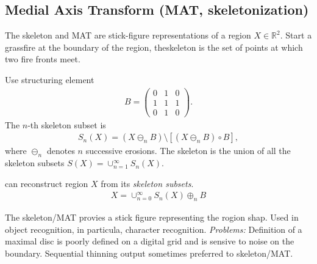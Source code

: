\subsection{Medial Axis Transform (MAT, skeletonization)}
	 The skeleton and MAT are stick-figure representations of a region $X\in\mathbb{R}^2$. Start a grassfire at the boundary of the region, theskeleton is the set of points at which two fire fronts meet.
\begin{compactdesc}
	\item[\lp{Skeleton}] Use structuring element
		\begin{gather*}
			B=\left( 
				\begin{smallmatrix}
					0&1&0\\
					1&1&1\\
					0&1&0
				\end{smallmatrix}\right).
		\end{gather*} The $n$-th skeleton subset is 
		\begin{gather*}
			S_n(X)=(X\ominus_nB)\setminus \left[ (X\ominus_n B)\circ B \right],
		\end{gather*} 
		where $\ominus_n$ denotes $n$ successive erosions. The skeleton is the union of all the skeleton subsets $S(X)=\cup_{n=1}^{\infty}S_n(X)$.
	\item[\lp{Reconstruction}] can reconstruct region $X$ from its \emph{skeleton subsets}.
		\begin{gather*}
			X=\cup_{n=0}^{\infty}S_n(X)\oplus_n B
		\end{gather*}
	\item[\lp{Applications and problems}] The skeleton/MAT provies a stick figure representing the rogion shap. Used in object recognition, in particula, character recognition. \emph{Problems:} Definition of a maximal disc is poorly defined on a digital grid and is sensive to noise on the boundary. Sequential thinning output sometimes preferred to skeleton/MAT.
\end{compactdesc}
